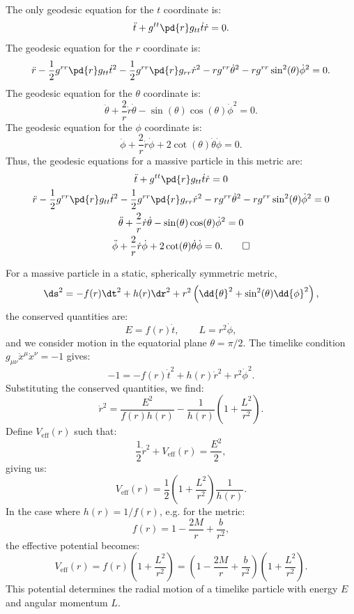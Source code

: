 \begin{solution}[(iii)]
  The only geodesic equation for the $t$ coordinate is:
  \[%
    \ddot{t} + g^{tt}\pd{r}g_{tt} \dot{t}\dot{r} = 0
  .\]%
  The geodesic equation for the $r$ coordinate is:
  \[%
    \ddot{r} - \frac{1}{2}g^{rr}\pd{r}g_{tt} \dot{t}^2 - \frac{1}{2}g^{rr}\pd{r}g_{rr} \dot{r}^2 - rg^{rr} \dot{\theta}^2 - rg^{rr}\sin^2(\theta) \dot{\phi}^2 = 0
  .\]%
  The geodesic equation for the $\theta$ coordinate is:
  \[%
    \ddot{\theta} + \frac{2}{r} \dot{r}\dot{\theta} - \sin(\theta)\cos(\theta) \dot{\phi}^2 = 0
  .\]%
  The geodesic equation for the $\phi$ coordinate is:
  \[%
    \ddot{\phi} + \frac{2}{r} \dot{r}\dot{\phi} + 2\cot(\theta) \dot{\theta}\dot{\phi} = 0
  .\]%
  Thus, the geodesic equations for a massive particle in this metric are:
  \begin{gather*}
    \ddot{t} + g^{tt}\pd{r}g_{tt} \dot{t}\dot{r} = 0 \\
    \ddot{r} - \frac{1}{2}g^{rr}\pd{r}g_{tt} \dot{t}^2 - \frac{1}{2}g^{rr}\pd{r}g_{rr} \dot{r}^2 - rg^{rr} \dot{\theta}^2 - rg^{rr}\sin^2(\theta) \dot{\phi}^2 = 0 \\
    \ddot{\theta} + \frac{2}{r} \dot{r}\dot{\theta} - \sin(\theta)\cos(\theta) \dot{\phi}^2 = 0 \\
    \ddot{\phi} + \frac{2}{r} \dot{r}\dot{\phi} + 2\cot(\theta) \dot{\theta}\dot{\phi} = 0
  .\qedhere\end{gather*}
\end{solution}

\begin{solution}[(iv)]
  For a massive particle in a static, spherically symmetric metric,
  \[%
    \ds^2 = -f(r)\dt^2 + h(r)\dr^2 + r^2 \left(\dd{\theta}^2 + \sin^2(\theta)\dd{\phi}^2\right)
  ,\]%
  the conserved quantities are:
  \[%
    E = f(r)\dot{t}, \qquad L = r^2 \dot{\phi}
  ,\]%
  and we consider motion in the equatorial plane $\theta = \pi/2$. The timelike condition $g_{\mu\nu}\dot{x}^\mu \dot{x}^\nu = -1$ gives:
  \[%
    -1 = -f(r)\dot{t}^2 + h(r) \dot{r}^2 + r^2 \dot{\phi}^2
  .\]%
  Substituting the conserved quantities, we find:
  \[%
    \dot{r}^2 = \frac{E^2}{f(r)h(r)} - \frac{1}{h(r)}\left(1 + \frac{L^2}{r^2}\right)
  .\]%
  Define $V_{\text{eff}}(r)$ such that:
  \[%
    \frac{1}{2}\dot{r}^2 + V_{\text{eff}}(r) = \frac{E^2}{2}
  ,\]%
  giving us:
  \[%
    V_{\text{eff}}(r) = \frac{1}{2} \left(1 + \frac{L^2}{r^2}\right) \frac{1}{h(r)}
  .\]%
  In the case where $h(r) = 1/f(r)$, e.g. for the metric:
  \[%
    f(r) = 1 - \frac{2M}{r} + \frac{b}{r^2}
  ,\]%
  the effective potential becomes:
  \[%
    V_{\text{eff}}(r) = f(r) \left(1 + \frac{L^2}{r^2}\right) = \left(1 - \frac{2M}{r} + \frac{b}{r^2}\right) \left(1 + \frac{L^2}{r^2}\right)
  .\]%
  This potential determines the radial motion of a timelike particle with energy $E$ and angular momentum $L$.
\end{solution}

